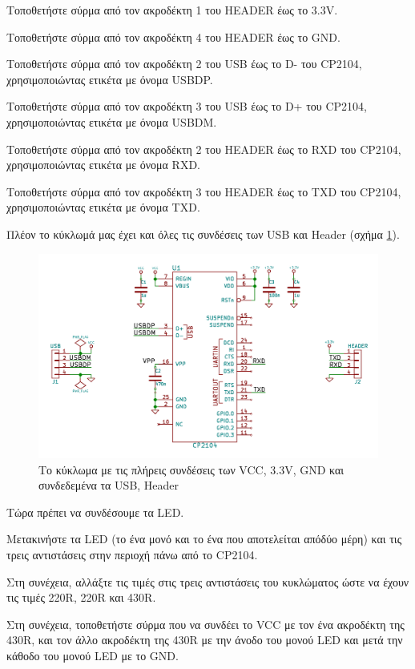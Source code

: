 \documentclass[a4paper]{article}
\begin{document}
Τοποθετήστε σύρμα από τον ακροδέκτη 1 του HEADER έως το 3.3V.

Τοποθετήστε σύρμα από τον ακροδέκτη 4 του HEADER έως το GND.

Τοποθετήστε σύρμα από τον ακροδέκτη 2 του USB έως το D- του CP2104, χρησιμοποιώντας ετικέτα με όνομα USBDP. 

Τοποθετήστε σύρμα από τον ακροδέκτη 3 του USB έως το D+ του CP2104, χρησιμοποιώντας ετικέτα με όνομα USBDM.

Τοποθετήστε σύρμα από τον ακροδέκτη 2 του HEADER έως το RXD του CP2104, χρησιμοποιώντας ετικέτα με όνομα RXD.

Τοποθετήστε σύρμα από τον ακροδέκτη 3 του HEADER έως το TXD του CP2104, χρησιμοποιώντας ετικέτα με όνομα TXD.

Πλέον το κύκλωμά μας έχει και όλες τις συνδέσεις των USB και Header (σχήμα \ref{fig:eesch-circ-allpwrheaders}).

\begin{figure}
  \begin{center}
    \includegraphics[width=.9\textwidth]{img/eesch-circ-allpwrheaders.png}
    \caption{Το κύκλωμα με τις πλήρεις συνδέσεις των VCC, 3.3V, GND και συνδεδεμένα τα USB, Header}
    \label{fig:eesch-circ-allpwrheaders}
  \end{center}
\end{figure}

Τώρα πρέπει να συνδέσουμε τα LED. 

Μετακινήστε τα LED (το ένα μονό και το ένα που αποτελείται απόδύο μέρη) και τις τρεις αντιστάσεις στην περιοχή πάνω από το CP2104.

Στη συνέχεια, αλλάξτε τις τιμές στις τρεις αντιστάσεις του κυκλώματος ώστε να έχουν τις τιμές 220R, 220R και 430R.

Στη συνέχεια, τοποθετήστε σύρμα που να συνδέει το VCC με τον ένα ακροδέκτη της 430R, και τον άλλο ακροδέκτη της 430R με την άνοδο του μονού LED και μετά την κάθοδο του μονού LED με το GND.
\end{document}
